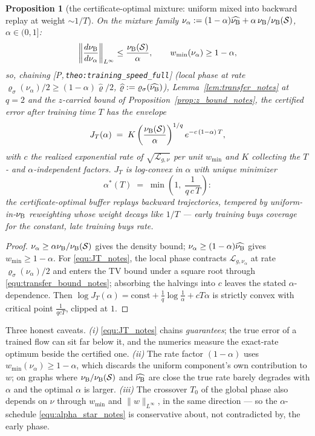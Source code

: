 \documentclass[11pt]{article}
\newtheorem{proposition}[theorem]{Proposition}
\theoremstyle{definition}
\theoremstyle{remark}
\def\lambda{\widehat\nuB}
\newcommand{\paperref}[1]{[P,\,\texttt{#1}]}   %
\begin{document}
\begin{proposition}[the certificate-optimal mixture: uniform mixed into backward replay
at weight $\sim1/T$]\label{prop:alpha_star_notes}
On the mixture family $\nu_\alpha:=(1-\alpha)\lambda+\alpha\,\nuB/\nuB(\Statespace)$,
$\alpha\in(0,1]$:
\begin{equation*}
    \left\|\frac{d\nu_{\mathrm{B}}}{d\nu_\alpha}\right\|_{L^\infty}\leq\frac{\nu_{\mathrm{B}}(\mathcal S)}{\alpha},
    \qquad w_{\min}(\nu_\alpha)\geq1-\alpha ,
\end{equation*}
so, chaining \paperref{theo:training\_speed\_full} (local phase at rate
$\varrho_\sigma(\nu_\alpha)/2\geq(1-\alpha)\widehat\varrho/2$,
$\widehat\varrho:=\varrho_\sigma(\lambda)$), Lemma~\ref{lem:transfer_notes} at $q=2$ and the
$z$-carried bound of Proposition~\ref{prop:z_bound_notes}, the certified error after training
time $T$ has the envelope
\begin{equation}\label{equ:JT_notes}
    J_T(\alpha)\;=\;K\left(\frac{\nu_{\mathrm{B}}(\mathcal S)}{\alpha}\right)^{1/q}
    e^{-c\,(1-\alpha)\,T},
\end{equation}
with $c$ the realized exponential rate of $\sqrt{\mathcal L_{g,\nu}}$ per unit
$w_{\min}$ and $K$ collecting the $T$- and $\alpha$-independent factors. $J_T$ is
log-convex in $\alpha$ with unique minimizer
\begin{equation}\label{equ:alpha_star_notes}
    \alpha^*(T)\;=\;\min\left(1,\;\frac{1}{q\,c\,T}\right):
\end{equation}
the certificate-optimal buffer replays backward trajectories, tempered by
uniform-in-$\nu_{\mathrm{B}}$ reweighting whose weight decays like $1/T$ --- early training buys
coverage for the constant, late training buys rate.
\end{proposition}

\begin{proof}
$\nu_\alpha\geq\alpha\nu_{\mathrm{B}}/\nu_{\mathrm{B}}(\mathcal S)$ gives the density bound;
$\nu_\alpha\geq(1-\alpha)\lambda$ gives $w_{\min}\geq1-\alpha$. For \eqref{equ:JT_notes}, the
local phase contracts $\mathcal L_{g,\nu_\alpha}$ at rate $\varrho_\sigma(\nu_\alpha)/2$
and enters the TV bound under a square root through \eqref{equ:transfer_bound_notes};
absorbing the halvings into $c$ leaves the stated $\alpha$-dependence. Then
$\log J_T(\alpha)=\mathrm{const}+\frac1q\log\frac1\alpha+c T\alpha$ is strictly convex
with critical point $\frac{1}{qcT}$, clipped at $1$.
\end{proof}

Three honest caveats. \emph{(i)} \eqref{equ:JT_notes} chains \emph{guarantees}; the true error
of a trained flow can sit far below it, and the numerics measure the exact-rate optimum
beside the certified one. \emph{(ii)} The rate factor $(1-\alpha)$ uses
$w_{\min}(\nu_\alpha)\geq1-\alpha$, which discards the uniform component's own
contribution to $w$; on graphs where $\nu_{\mathrm{B}}/\nu_{\mathrm{B}}(\mathcal S)$ and $\lambda$ are
close the true rate barely degrades with $\alpha$ and the optimal $\alpha$ is larger.
\emph{(iii)} The crossover $T_0$ of the global phase also depends on $\nu$ through
$w_{\min}$ and $\|w\|_{L^\infty}$, in the same direction --- so the $\alpha$-schedule
\eqref{equ:alpha_star_notes} is conservative about, not contradicted by, the early phase.
\end{document}
